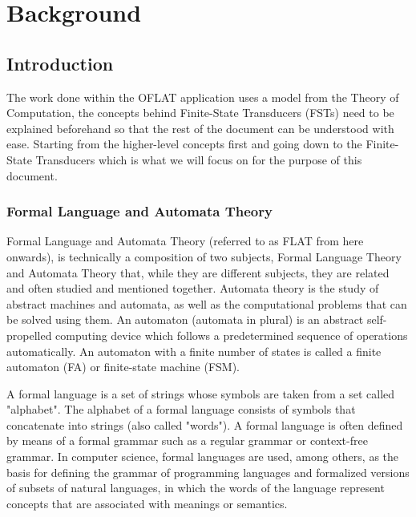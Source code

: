 
%

\chapter{Background}
\label{cha:background}

\section{Introduction}

The work done within the OFLAT application uses a model from the Theory of Computation, 
the concepts behind Finite-State Transducers (FSTs) need to be explained beforehand so that the rest of the document
can be understood with ease. Starting from the higher-level concepts first and going down to the Finite-State Transducers 
which is what we will focus on for the purpose of this document.

\subsection{Formal Language and Automata Theory}

Formal Language and Automata Theory (referred to as FLAT from here onwards), is technically a composition of two subjects, Formal Language Theory
and Automata Theory that, while they are different subjects, they are related and often studied and mentioned together.
Automata theory is the study of abstract machines and automata, as well as the computational problems that can be solved using them.
An automaton (automata in plural) is an abstract self-propelled computing device which follows a predetermined sequence of operations automatically. 
An automaton with a finite number of states is called a finite automaton (FA) or finite-state machine (FSM).

A formal language is a set of strings whose symbols are taken from a set called "alphabet".
The alphabet of a formal language consists of symbols that concatenate into strings (also called "words"). 
A formal language is often defined by means of a formal grammar such as a regular grammar or context-free grammar.
In computer science, formal languages are used, among others, as the basis for defining the grammar of programming languages and formalized versions of subsets of natural languages, 
in which the words of the language represent concepts that are associated with meanings or semantics. 

